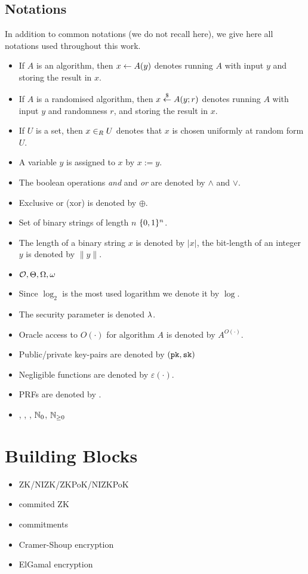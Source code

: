\subsection{Notations}
In addition to common notations (we do not recall here), we give here all notations used throughout this work.
\begin{itemize}
	\item If $A$ is an algorithm, then $x\gets A(y)$ denotes running $A$ with input $y$ and storing the result in $x$.
	\item If $A$ is a randomised algorithm, then $x\stackrel{\$}{\gets} A(y;r)$ denotes running $A$ with input $y$ and randomness $r$, and storing the result in $x$.
	\item If $U$ is a set, then $x\in_R U$ denotes that $x$ is chosen uniformly at random form $U$.
	\item A variable $y$ is assigned to $x$ by $x:=y$.
	\item The boolean operations \emph{and} and \emph{or} are denoted by $\wedge$ and $\vee$.
	\item Exclusive or (xor) is denoted by $\oplus$.
	\item Set of binary strings of length $n$ $\{0,1\}^n$.
	\item The length of a binary string $x$ is denoted by $|x|$, the bit-length of an integer $y$ is denoted by $\|y\|$.
	\item $\mathcal{O},\Theta,\Omega,\omega$
	\item Since $\log_2$ is the most used logarithm we denote it by $\log$.
	\item The security parameter is denoted $\lambda$.
	\item Oracle access to $O(\cdot)$ for algorithm $A$ is denoted by $A^{O(\cdot)}$.
	\item Public/private key-pairs are denoted by $(\mathtt{pk},\mathtt{sk})$
	\item Negligible functions are denoted by $\varepsilon(\cdot)$.
	\item \aclp{PRF} are denoted by \PRF.
	\item \ZZ, \NN, \RR, $\mathbb{N}_0$, $\mathbb{N}_{\geq 0}$
\end{itemize}


\section{Building Blocks}
\begin{itemize}
  \item ZK/NIZK/ZKPoK/NIZKPoK
  \item commited ZK
  \item commitments
  \item Cramer-Shoup encryption
  \item ElGamal encryption
\end{itemize}



